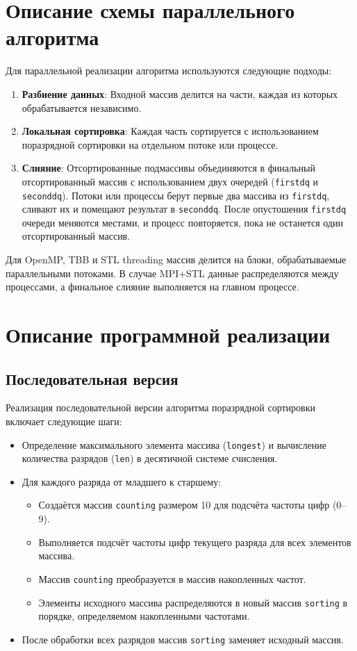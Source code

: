 \documentclass[a4paper,12pt]{article}
\begin{document}
\section{Описание схемы параллельного алгоритма}
Для параллельной реализации алгоритма используются следующие подходы:
\begin{enumerate}
    \item \textbf{Разбиение данных}: Входной массив делится на части, каждая из которых обрабатывается независимо.
    \item \textbf{Локальная сортировка}: Каждая часть сортируется с использованием поразрядной сортировки на отдельном потоке или процессе.
    \item \textbf{Слияние}: Отсортированные подмассивы объединяются в финальный отсортированный массив с использованием двух очередей (\texttt{firstdq} и \texttt{seconddq}). Потоки или процессы берут первые два массива из \texttt{firstdq}, сливают их и помещают результат в \texttt{seconddq}. После опустошения \texttt{firstdq} очереди меняются местами, и процесс повторяется, пока не останется один отсортированный массив.
\end{enumerate}
Для OpenMP, TBB и STL threading массив делится на блоки, обрабатываемые параллельными потоками. В случае MPI+STL данные распределяются между процессами, а финальное слияние выполняется на главном процессе.

\section{Описание программной реализации}
\subsection{Последовательная версия}
Реализация последовательной версии алгоритма поразрядной сортировки включает следующие шаги:
\begin{itemize}
    \item Определение максимального элемента массива (\texttt{longest}) и вычисление количества разрядов (\texttt{len}) в десятичной системе счисления.
    \item Для каждого разряда от младшего к старшему:
        \begin{itemize}
            \item Создаётся массив \texttt{counting} размером 10 для подсчёта частоты цифр (0–9).
            \item Выполняется подсчёт частоты цифр текущего разряда для всех элементов массива.
            \item Массив \texttt{counting} преобразуется в массив накопленных частот.
            \item Элементы исходного массива распределяются в новый массив \texttt{sorting} в порядке, определяемом накопленными частотами.
        \end{itemize}
    \item После обработки всех разрядов массив \texttt{sorting} заменяет исходный массив.
\end{itemize}
\end{document}
